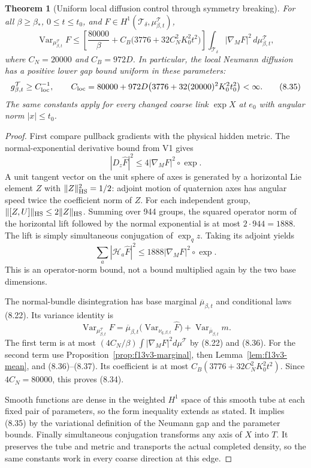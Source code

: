 \documentclass[11pt,oneside]{article}
\newtheorem{theorem}{Theorem}[section]
\DeclareMathOperator{\Var}{Var}
\newcommand{\cT}{\mathcal T}
\begin{document}
\begin{theorem}[Uniform local diffusion control through symmetry breaking]
\label{thm:f13v3-uniform}
For all \(\beta\ge\beta_*\),
\(0\le t\le t_0\), and
\(F\in H^1(\cT_\delta,\mu_{\beta,t}^{\cT})\),
\[
 \Var_{\mu_{\beta,t}^{\cT}}F
 \le
 \left[
       \frac{80000}{\beta}
        +C_B\bigl(3776+32C_N^2K_0^2t^2\bigr)
 \right]
       \int_{\cT_\delta}|\nabla_MF|^2\,d\mu_{\beta,t}^{\cT},
 \tag{8.34}
\]
where \(C_N=20000\) and
\(C_B=972D\).
In particular, the local
Neumann diffusion has a
positive lower gap bound
uniform in these parameters:
\[
 g_{\beta,t}^{\cT}\ge C_{\rm loc}^{-1},
 \qquad
 C_{\rm loc}
  =80000+972D\bigl(3776+32(20000)^2K_0^2t_0^2\bigr)<\infty.
 \tag{8.35}
\]
The same constants apply
for every changed coarse
link \(\exp X\) at \(e_0\)
with angular norm \(|x|\le t_0\).
\end{theorem}
\begin{proof}
First compare pullback gradients
with the physical hidden metric.
The normal-exponential derivative
bound from V1 gives
\[
                   |D_z\widehat F|^2
                          \le4|\nabla_MF|^2\circ\exp.
 \tag{8.36}
\]
A unit tangent vector on the
unit sphere of axes is generated
by a horizontal Lie element
\(Z\) with
\(\|Z\|_{\rm HS}^2=1/2\):
adjoint motion of quaternion
axes has angular speed twice
the coefficient norm of \(Z\).
For each independent group,
\(\|[Z,U]\|_{\rm HS}\le2\|Z\|_{\rm HS}\).
Summing over 944 groups,
the squared operator norm
of the horizontal lift followed
by the normal exponential
is at most \(2\cdot944=1888\).
The lift is simply simultaneous
conjugation of \(\exp_qz\).
Taking its adjoint yields
\[
              \sum_a|\mathcal H_a\widehat F|^2
                          \le1888|\nabla_MF|^2\circ\exp.
 \tag{8.37}
\]
This is an operator-norm bound,
not a bound multiplied again
by the two base dimensions.

The normal-bundle disintegration
has base marginal
\(\overline\mu_{\beta,t}\) and
conditional laws (8.22).
Its variance identity is
\[
 \Var_{\mu_{\beta,t}^{\cT}}F
       =\overline\mu_{\beta,t}
                      \bigl(\Var_{\nu_{q,\beta,t}}\widehat F\bigr)
                         +\Var_{\overline\mu_{\beta,t}}m.
 \tag{8.38}
\]
The first term is at most
\((4C_N/\beta)\int|\nabla_MF|^2d\mu^{\cT}\)
by (8.22) and (8.36).
For the second term use
Proposition~\ref{prop:f13v3-marginal},
then Lemma~\ref{lem:f13v3-mean},
and (8.36)--(8.37).
Its coefficient is at most
\(C_B(3776+32C_N^2K_0^2t^2)\).
Since \(4C_N=80000\), this
proves (8.34).

Smooth functions are dense
in the weighted \(H^1\)
space of this smooth tube
at each fixed pair of
parameters, so the form
inequality extends as stated.
It implies (8.35) by the
variational definition of
the Neumann gap and the
parameter bounds.
Finally simultaneous
conjugation transforms any
axis of \(X\) into \(T\).
It preserves the tube and
metric and transports the
actual completed density,
so the same constants
work in every coarse
direction at this edge.
\end{proof}
\end{document}
